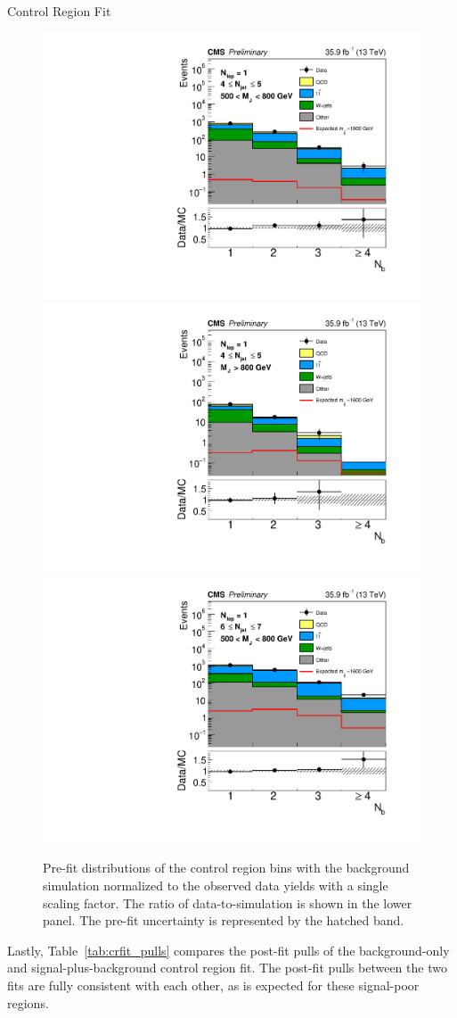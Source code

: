 \begin{subsection}{Control Region Fit}
\begin{figure}[tbp!]
\begin{center}
\includegraphics[angle=0,width=0.32\columnwidth]{fig/prefit_nlep1_nj45_lowmj.pdf}
\includegraphics[angle=0,width=0.32\columnwidth]{fig/prefit_nlep1_nj45_highmj.pdf}
\includegraphics[angle=0,width=0.32\columnwidth]{fig/prefit_nlep1_nj67_lowmj.pdf}
\end{center}
\caption{Pre-fit \Nb distributions of the control region bins with the background simulation normalized to the observed data yields with a single scaling factor.
The ratio of data-to-simulation is shown in the lower panel.
The pre-fit uncertainty is represented by the hatched band.}
\label{fig:prefit_cr}
\end{figure}

Lastly, Table~\ref{tab:crfit_pulls} compares the post-fit pulls of the background-only and signal-plus-background control region fit.
The post-fit pulls between the two fits are fully consistent with each other, as is expected for these signal-poor regions.


\end{subsection}
